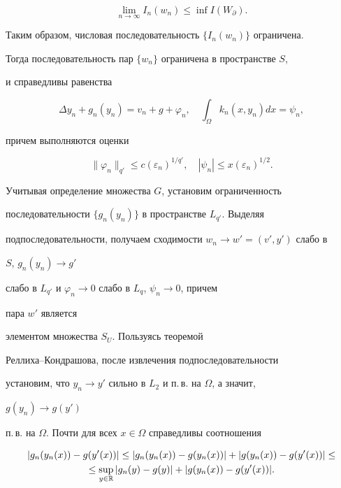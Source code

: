 \begin{pf}
\begin{equation}
\lim_{n\to\infty}I_n(w_n)\le \inf I(W_\partial). 


\end{equation} 


Таким образом, числовая последовательность $\{I_n(w_n)\}$ ограничена. 


Тогда последовательность пар $\{w_n\}$ ограничена в пространстве $S$, 


и справедливы равенства 


\begin{equation} 


\Delta y_n+g_n(y_n)=v_n+g+\varphi_n,\quad \int_\Omega 


k_n(x,y_n)dx=\psi_n, 


\end{equation} 


причем выполняются оценки 


$$ 


\|\varphi_n\|_{q'}\le c(\varepsilon_n)^{1/q'},\quad 


|\psi_n|\le x(\varepsilon_n)^{1/2}. 


$$ 


Учитывая определение множества $G$, установим ограниченность 


последовательности $\{g_n(y_n)\}$ в пространстве $L_{q'}$. Выделяя 


подпоследовательности, получаем сходимости $w_n\to w'=(v',y')$ слабо в 


$S$, $g_n(y_n)\to g'$ 


слабо в $L_{q'}$ и $\varphi_n\to0$ слабо в $L_q$, $\psi_n\to0$, причем 


пара $w'$ является 


элементом множества $S_U$. Пользуясь теоремой 


Реллиха--Кондрашова, после извлечения подпоследовательности 


установим, что $y_n\to y'$ сильно в $L_2$ и п.\,в. на $\Omega$, а значит, 


$g(y_n)\to g(y')$ 


п.\,в. на $\Omega$. Почти для всех $x\in\Omega$ справедливы соотношения 


\begin{gather*} 


|g_n(y_n(x))-g(y'(x))|\le|g_n(y_n(x))-g(y_n(x))|+ 


|g(y_n(x))-g(y'(x))|\le \\ 


% 


\le \sup_{y\in\Bbb R}|g_n(y)-g(y)|+|g(y_n(x))-g(y'(x))|. 



\end{gather*}
\end{pf}
